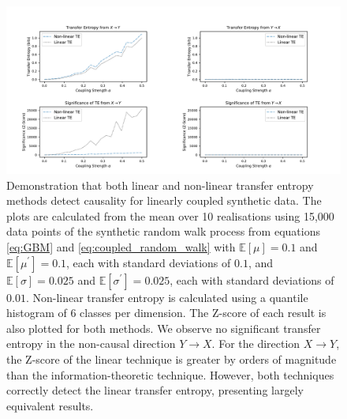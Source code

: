 \documentclass[]{rsos}%
\begin{document}
  \begin{figure}[!htb]
    \includegraphics[width=\linewidth]{images/confirming_gbm.pdf}
    \caption{Demonstration that both linear and non-linear transfer entropy methods detect causality for linearly coupled synthetic data. The plots are calculated from the mean over 10 realisations using 15,000 data points of the synthetic random walk process from equations \ref{eq:GBM} and \ref{eq:coupled_random_walk} with $\mathbb{E} [\mu]=0.1$ and $\mathbb{E} [\mu^{\prime}]=0.1$, each with standard deviations of $0.1$, and $\mathbb{E} [\sigma]=0.025$ and $\mathbb{E} [\sigma^{\prime}]=0.025$, each with standard deviations of $0.01$.
    Non-linear transfer entropy is calculated using a quantile histogram of 6 classes per dimension. The Z-score of each result is also plotted for both methods. We observe no significant transfer entropy in the non-causal direction $Y \rightarrow X$. For the direction $X \rightarrow Y$, the Z-score of the linear technique is greater by orders of magnitude than the information-theoretic technique. However, both techniques correctly detect the linear transfer entropy, presenting largely equivalent results.}
    \label{fig:GBM_confirmation}


\end{figure}
\end{document}
